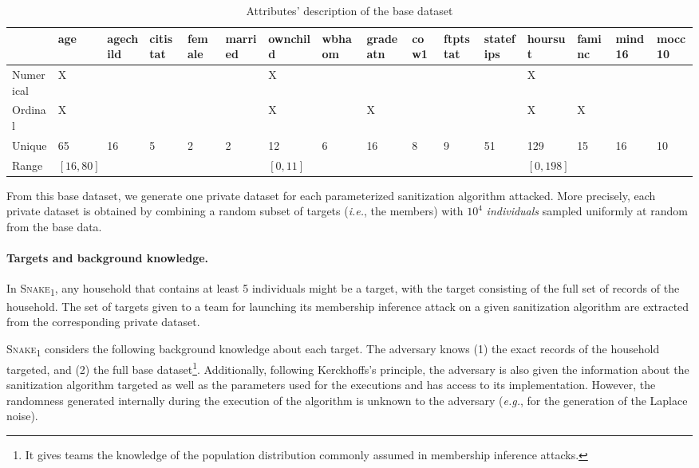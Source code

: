 \documentclass{article}
\newcommand{\rot}[1]{%
  \ifdefined\HCode
    {#1}
  \else
    \multicolumn{1}{R{45}{1em}}{#1}%
  \fi
}
\newcommand{\name}{\textsc{Snake}\xspace}
\begin{document}
\begin{table}
  \caption{Attributes' description of the base dataset}
  \label{tab:attributes}
 \begin{tabular}{*{16}{l}}
                     & 
     \rot{age}       & 
     \rot{agechild}  & 
     \rot{citistat}  & 
     \rot{female}    & 
     \rot{married}   & 
     \rot{ownchild}  & 
     \rot{wbhaom}    & 
     \rot{gradeatn}  & 
     \rot{cow1}      & 
     \rot{ftptstat}  & 
     \rot{statefips} & 
     \rot{hoursut}   & 
     \rot{faminc}    & 
     \rot{mind16}    & 
     \rot{mocc10}                                                                                                \\ \midrule
    Numerical        & X          &    &   &   &   & X         &   &    &   &   &    & X          &    &    &    \\
    Ordinal          & X          &    &   &   &   & X         &   & X  &   &   &    & X          & X  &    &    \\
    Unique           & 65         & 16 & 5 & 2 & 2 & 12        & 6 & 16 & 8 & 9 & 51 & 129        & 15 & 16 & 10 \\
    Range            & $[16, 80]$ &    &   &   &   & $[0, 11]$ &   &    &   &   &    & $[0, 198]$ &    &    &    \\
  \end{tabular}
\end{table}

From this base dataset, we generate one private dataset for each parameterized sanitization algorithm attacked.
More precisely, each private dataset is obtained by combining a random subset of targets (\emph{i.e.}, the members) with $10^4$ \emph{individuals} sampled uniformly at random from the base data.

\paragraph{Targets and background knowledge.}
In \name\textsubscript{1}, any household that contains at least 5 individuals might be a target, with the target consisting of the full set of records of the household.
The set of targets given to a team for launching its membership inference attack on a given sanitization algorithm are extracted from the corresponding private dataset.

\name\textsubscript{1} considers the following background knowledge about each target.
The adversary knows (1) the exact records of the household targeted, and (2) the full base dataset\footnote{It gives teams the knowledge of the population distribution commonly assumed in
  membership inference attacks.}.
Additionally, following Kerckhoffs's principle, the adversary is also given the information about the sanitization algorithm targeted as well as the parameters used for the executions and has access to its implementation.
However, the randomness generated internally during the execution of the algorithm is unknown to the adversary (\emph{e.g.}, for the generation of the Laplace noise). %
\end{document}
